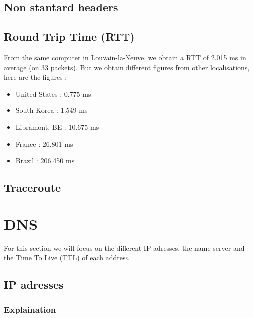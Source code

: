 \documentclass{article}
\begin{document}
\subsection{Non stantard headers}
\label{sub:nonstandard}

\subsection{Round Trip Time (RTT)}
\label{sub:rtt}

From the same computer in Louvain-la-Neuve, we obtain a RTT of 2.015 ms in average (on 33 packets). But we obtain different figures from other localisations, here are the figures : 
\begin{itemize}
    \itemsep-0.1em 
    \item United States :  0.775 ms
    \item South Korea : 1.549 ms
    \item Libramont, BE : 10.675 ms
    \item France : 26.801 ms
    \item Brazil : 206.450 ms
\end{itemize}

\subsection{Traceroute}
\label{sub:trace}

\section{DNS}
\label{sec:DNS}


For this section we will focus on the different IP adresses, the name server and the Time To Live (TTL) of each address.

\subsection{IP adresses}

\subsubsection{Explaination}
\label{subsub:ipexp}
\end{document}
